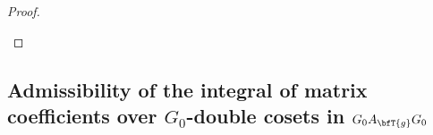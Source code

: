 \documentclass[12pt,a4paper]{amsart}%
\newcommand{\claude}[1]{{{#1}}}
\newcommand{\RamiE}[1]{{{#1}}}
\begin{document}
\begin{proof}
\begin{itemize}

\end{itemize}
\end{proof}

\subsection{Admissibility of the integral of matrix coefficients over $G_0$-double cosets in $G_0 A_\bfT \RamiE{g} G_0$}\label{ssec:avg}
\end{document}
